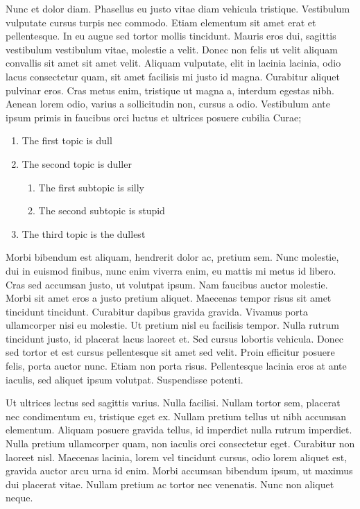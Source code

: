 Nunc et dolor diam. Phasellus eu justo vitae diam vehicula tristique. Vestibulum vulputate cursus turpis nec commodo. Etiam elementum sit amet erat et pellentesque. In eu augue sed tortor mollis tincidunt. Mauris eros dui, sagittis vestibulum vestibulum vitae, molestie a velit. Donec non felis ut velit aliquam convallis sit amet sit amet velit. Aliquam vulputate, elit in lacinia lacinia, odio lacus consectetur quam, sit amet facilisis mi justo id magna. Curabitur aliquet pulvinar eros. Cras metus enim, tristique ut magna a, interdum egestas nibh. Aenean lorem odio, varius a sollicitudin non, cursus a odio. Vestibulum ante ipsum primis in faucibus orci luctus et ultrices posuere cubilia Curae;
\begin{enumerate}
\item The first topic is dull
\item The second topic is duller
\begin{enumerate}
\item The first subtopic is silly
\item The second subtopic is stupid
\end{enumerate}
\item The third topic is the dullest
\end{enumerate}
Morbi bibendum est aliquam, hendrerit dolor ac, pretium sem. Nunc molestie, dui in euismod finibus, nunc enim viverra enim, eu mattis mi metus id libero. Cras sed accumsan justo, ut volutpat ipsum. Nam faucibus auctor molestie. Morbi sit amet eros a justo pretium aliquet. Maecenas tempor risus sit amet tincidunt tincidunt. Curabitur dapibus gravida gravida. Vivamus porta ullamcorper nisi eu molestie. Ut pretium nisl eu facilisis tempor. Nulla rutrum tincidunt justo, id placerat lacus laoreet et. Sed cursus lobortis vehicula. Donec sed tortor et est cursus pellentesque sit amet sed velit. Proin efficitur posuere felis, porta auctor nunc. Etiam non porta risus. Pellentesque lacinia eros at ante iaculis, sed aliquet ipsum volutpat. Suspendisse potenti.

Ut ultrices lectus sed sagittis varius. Nulla facilisi. Nullam tortor sem, placerat nec condimentum eu, tristique eget ex. Nullam pretium tellus ut nibh accumsan elementum. Aliquam posuere gravida tellus, id imperdiet nulla rutrum imperdiet. Nulla pretium ullamcorper quam, non iaculis orci consectetur eget. Curabitur non laoreet nisl. Maecenas lacinia, lorem vel tincidunt cursus, odio lorem aliquet est, gravida auctor arcu urna id enim. Morbi accumsan bibendum ipsum, ut maximus dui placerat vitae. Nullam pretium ac tortor nec venenatis. Nunc non aliquet neque.

